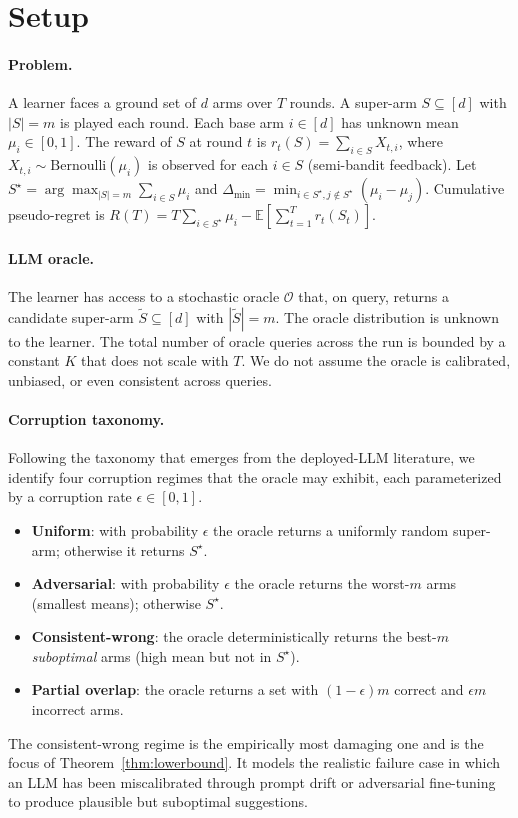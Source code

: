 \documentclass{article}
\theoremstyle{plain}
\theoremstyle{definition}
\theoremstyle{remark}
\newcommand{\E}{\mathbb{E}}
\newcommand{\opt}{S^{\star}}
\newcommand{\gap}{\Delta_{\min}}
\begin{document}
\section{Setup}
\label{sec:setup}

\paragraph{Problem.} A learner faces a ground set of $d$ arms over $T$ rounds. A super-arm $S \subseteq [d]$ with $|S| = m$ is played each round. Each base arm $i \in [d]$ has unknown mean $\mu_i \in [0,1]$. The reward of $S$ at round $t$ is $r_t(S) = \sum_{i \in S} X_{t,i}$, where $X_{t,i} \sim \mathrm{Bernoulli}(\mu_i)$ is observed for each $i \in S$ (semi-bandit feedback). Let $\opt = \arg\max_{|S|=m} \sum_{i \in S} \mu_i$ and $\gap = \min_{i \in \opt, j \notin \opt} (\mu_i - \mu_j)$. Cumulative pseudo-regret is $R(T) = T \sum_{i \in \opt} \mu_i - \E[\sum_{t=1}^{T} r_t(S_t)]$.

\paragraph{LLM oracle.} The learner has access to a stochastic oracle $\mathcal{O}$ that, on query, returns a candidate super-arm $\tilde{S} \subseteq [d]$ with $|\tilde{S}| = m$. The oracle distribution is unknown to the learner. The total number of oracle queries across the run is bounded by a constant $K$ that does not scale with $T$. We do not assume the oracle is calibrated, unbiased, or even consistent across queries.

\paragraph{Corruption taxonomy.} Following the taxonomy that emerges from the deployed-LLM literature, we identify four corruption regimes that the oracle may exhibit, each parameterized by a corruption rate $\epsilon \in [0,1]$.
\begin{itemize}
\item \textbf{Uniform}: with probability $\epsilon$ the oracle returns a uniformly random super-arm; otherwise it returns $\opt$.
\item \textbf{Adversarial}: with probability $\epsilon$ the oracle returns the worst-$m$ arms (smallest means); otherwise $\opt$.
\item \textbf{Consistent-wrong}: the oracle deterministically returns the best-$m$ \emph{suboptimal} arms (high mean but not in $\opt$).
\item \textbf{Partial overlap}: the oracle returns a set with $(1-\epsilon) m$ correct and $\epsilon m$ incorrect arms.
\end{itemize}
The consistent-wrong regime is the empirically most damaging one and is the focus of Theorem~\ref{thm:lowerbound}. It models the realistic failure case in which an LLM has been miscalibrated through prompt drift or adversarial fine-tuning to produce plausible but suboptimal suggestions.
\end{document}
